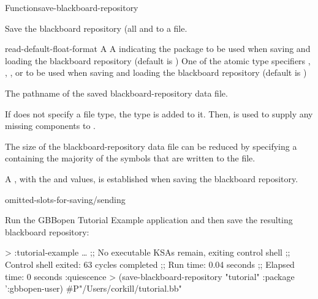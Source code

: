 \documentclass[10pt,twoside,english,pdftex]{article}
\begin{document}
\begin{functiondoc}{Function}{save-blackboard-repository}{
      
    \returns{} }
%
% 

\fnsyntax 

\fnpurpose Save the blackboard repository (all  and
 to a file.

\fnpackage {}

\fnmodule {}

\fnargs
\begin{args}{read-default-float-format}
\arg[pathname] A 
\arg[package] A  indicating the package to be used
when saving and loading the blackboard repository (default is
)
 One of the atomic type specifiers
, , , or
 to be used when saving and loading the blackboard repository
(default is )
\end{args}

\fnreturns The pathname of the saved blackboard-repository data file.

\fndescription If  does not specify a file type, the type
 is added to it.  Then,  is used to
supply any missing components to .

The size of the blackboard-repository data file can be reduced by specifying a
 containing the majority of the symbols that are written to the
file.

A \textbf{}, with the
 and  values, is
established when saving the blackboard repository.

\begin{alsos}{omitted-slots-for-saving/sending}
\end{alsos}

\fnexample Run the GBBopen Tutorial Example application and then save the
resulting blackboard repository:
\begin{example}
  > :tutorial-example
      \textrm{\ldots{}}
  ;; No executable KSAs remain, exiting control shell
  ;; Control shell exited: 63 cycles completed
  ;; Run time: 0.04 seconds
  ;; Elapsed time: 0 seconds
  :quiescence
  > (save-blackboard-repository "tutorial" :package ':gbbopen-user)
  #P"/Users/corkill/tutorial.bb"
\end{example}

\end{functiondoc}
\end{document}
